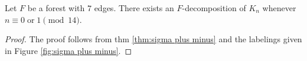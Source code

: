 \newpage


\begin{thm}\label{thm:0 or 1 mod 14}
    Let $F$ be a forest with $7$ edges. There exists an $F$-decomposition of $K_n$ whenever $n \equiv 0 \; \textrm{or} \; 1 \pmod{14}.$
\end{thm}
\begin{proof}
    The proof follows from thm \ref{thm:sigma plus minus} and the labelings given in Figure \ref{fig:sigma plus minus}.
\end{proof}